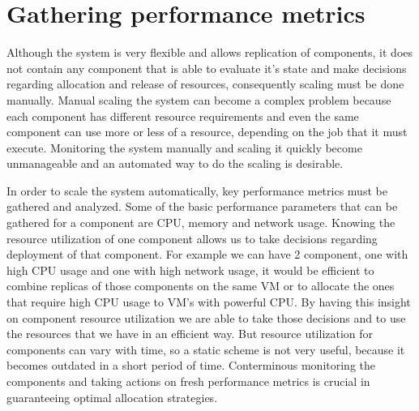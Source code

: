 \section{Gathering performance metrics}
Although the system is very flexible and allows replication of components, it does not contain any component that is able to evaluate it's state and make decisions regarding allocation and release of resources, consequently scaling must be done manually. Manual scaling the system can become a complex problem because each component has different resource requirements and even the same component can use more or less of a resource, depending on the job that it must execute. Monitoring the system manually and scaling it quickly become unmanageable and an automated way to do the scaling is desirable. 

In order to scale the system automatically, key performance metrics must be gathered and analyzed. Some of the basic performance parameters that can be gathered for a component are CPU, memory and network usage. Knowing the resource utilization of one component allows us to take decisions regarding deployment of that component. For example we can have 2 component, one with high CPU usage and one with high network usage, it would be efficient to combine replicas of those components on the same VM or to allocate the ones that require high CPU usage to VM's with powerful CPU. By having this insight on component resource utilization we are able to take those decisions and to use the resources that we have in an efficient way. But resource utilization for components can vary with time, so a static scheme is not very useful, because it becomes outdated in a short period of time. Conterminous monitoring the components and taking actions on fresh performance metrics is crucial in guaranteeing optimal allocation strategies.

